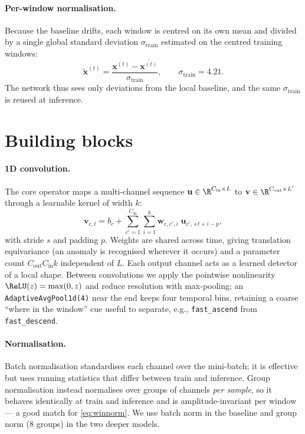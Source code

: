 \paragraph{Per-window normalisation.} Because the baseline drifts, each window is
centred on its own mean and divided by a single global standard deviation
$\sigma_{\mathrm{train}}$ estimated on the centred training windows:
\begin{equation}
    \tilde{\mathbf{x}}^{(t)}
    = \frac{\mathbf{x}^{(t)} - \overline{\mathbf{x}^{(t)}}}{\sigma_{\mathrm{train}}},
    \qquad \sigma_{\mathrm{train}} = 4.21 .
    \label{eq:winnorm}
\end{equation}
The network thus sees only deviations from the local baseline, and the same
$\sigma_{\mathrm{train}}$ is reused at inference.

\section{Building blocks}
\label{sec:blocks}

\paragraph{1D convolution.} The core operator maps a multi-channel sequence
$\mathbf{u}\in\R^{C_{\mathrm{in}}\times L}$ to
$\mathbf{v}\in\R^{C_{\mathrm{out}}\times L'}$ through a learnable kernel of width
$k$:
\begin{equation}
    \mathbf{v}_{c,t}
    = b_c + \sum_{c'=1}^{C_{\mathrm{in}}}\sum_{i=1}^{k}
        \mathbf{w}_{c,c',i}\;\mathbf{u}_{c',\,s\,t+i-p},
    \label{eq:conv}
\end{equation}
with stride $s$ and padding $p$. Weights are shared across time, giving
translation equivariance (an anomaly is recognised wherever it occurs) and a
parameter count $C_{\mathrm{out}}C_{\mathrm{in}}k$ independent of $L$. Each
output channel acts as a learned detector of a local shape. Between convolutions
we apply the pointwise nonlinearity $\ReLU(z)=\max(0,z)$ and reduce resolution
with max-pooling; an \texttt{AdaptiveAvgPool1d(4)} near the end keeps four
temporal bins, retaining a coarse ``where in the window'' cue useful to separate,
e.g., \texttt{fast\_ascend} from \texttt{fast\_descend}.

\paragraph{Normalisation.} Batch normalisation \cite{ioffe2015batch} standardises
each channel over the mini-batch; it is effective but uses running statistics
that differ between train and inference. Group normalisation \cite{wu2018group}
instead normalises over groups of channels \emph{per sample}, so it behaves
identically at train and inference and is amplitude-invariant per window --- a
good match for \cref{eq:winnorm}. We use batch norm in the baseline and group
norm (8 groups) in the two deeper models.

